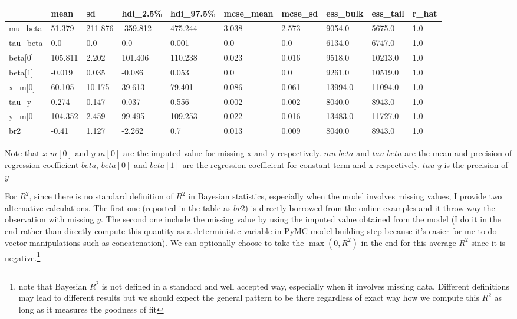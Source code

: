 \documentclass{homeworg}
\begin{document}
\begin{table}[h]
	\begin{tabular}{llllllllll}
		\hline \hline
		& mean    & sd     & hdi\_2.5\% & hdi\_97.5\% & mcse\_mean & mcse\_sd & ess\_bulk & ess\_tail & r\_hat \\ \hline
		mu\_beta                   & 51.379  & 211.876 & -359.812 & 475.244 & 3.038 & 2.573 & 9054.0  & 5675.0  & 1.0 \\
		tau\_beta                  & 0.0     & 0.0     & 0.0      & 0.001   & 0.0   & 0.0   & 6134.0  & 6747.0  & 1.0 \\
		beta{[}0{]}                & 105.811 & 2.202   & 101.406  & 110.238 & 0.023 & 0.016 & 9518.0  & 10213.0 & 1.0 \\
		beta{[}1{]}                & -0.019  & 0.035   & -0.086   & 0.053   & 0.0   & 0.0   & 9261.0  & 10519.0 & 1.0 \\
		x\_m{[}0{]} & 60.105  & 10.175  & 39.613   & 79.401  & 0.086 & 0.061 & 13994.0 & 11094.0 & 1.0 \\
		tau\_y                  & 0.274   & 0.147   & 0.037    & 0.556   & 0.002 & 0.002 & 8040.0  & 8943.0  & 1.0 \\
		y\_m{[}0{]}        & 104.352 & 2.459   & 99.495   & 109.253 & 0.022 & 0.016 & 13483.0 & 11727.0 & 1.0 \\
		br2 & -0.41 & 1.127 & -2.262 & 0.7 & 0.013 & 0.009 & 8040.0 & 8943.0 & 1.0
		\\ \hline \hline
	\end{tabular}
Note that $x\_m[0]$ and $y\_m[0]$  are the imputed value for missing x and y respectively. $mu\_beta$ and $tau\_beta$ are the mean and precision of regression coefficient $beta$, $beta[0]$ and $beta[1]$ are the regression coefficient for constant term and x respectively. $tau\_y$ is the precision of $y$ 
\end{table}


For $R^2$, since there is no standard definition of $R^2$ in Bayesian statistics, especially when the model involves missing values, I provide two alternative calculations. The first one (reported in the table as $br2$) is directly borrowed from the online examples and it throw way the observation with missing $y$. The second one include the missing value by using the imputed value obtained from the model (I do it in the end rather than directly compute this quantity as a deterministic variable in PyMC model building step because it's easier for me to do vector manipulations such as concatenation).  We can optionally choose to take the $\max(0,R^2)$ in the end for this average $R^2$ since it is negative.\footnote{note that Bayesian $R^2$ is not defined in a standard and well accepted way, especially when it involves missing data. Different definitions may lead to different results but we should expect the general pattern to be there regardless of exact way how we compute this $R^2$ as long as it measures the goodness of fit}
\end{document}
